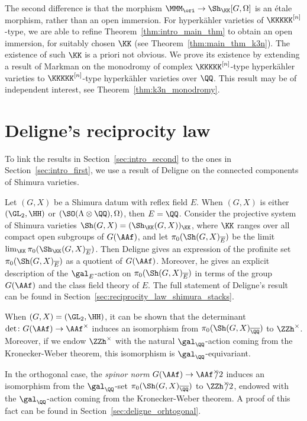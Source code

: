 The second difference is that the morphism $\MMM_{\ori} \rightarrow \Sh_{\KK}[G,\Omega]$ is an \'etale morphism, rather than an open immersion. For hyperk\"ahler varieties of $\KKKKK^{[n]}$-type, we are able to refine Theorem~\ref{thm:intro_main_thm} to obtain an open immersion, for suitably chosen $\KK$ (see Theorem~\ref{thm:main_thm_k3n}). The existence of such $\KK$ is a priori not obvious. We prove its existence by extending a result of Markman on the monodromy of complex $\KKKKK^{[n]}$-type hyperk\"ahler varieties to $\KKKKK^{[n]}$-type hyperk\"ahler varieties over $\QQ$. This result may be of independent interest, see Theorem~\ref{thm:k3n_monodromy}.


\section{Deligne's reciprocity law}
To link the results in Section~\ref{sec:intro_second} to the ones in Section~\ref{sec:intro_first}, we use a result of Deligne on the connected components of Shimura varieties. 

Let $(G,X)$ be a Shimura datum with reflex field $E$. When $(G,X)$ is either $(\GL_2,\HH)$ or $(\SO(\Lambda \otimes \QQ), \Omega)$, then $E = \QQ$. Consider the projective system of Shimura varieties $\Sh(G,X) = (\Sh_{\KK}(G,X))_{\KK}$, where $\KK$ ranges over all compact open subgroups of $G(\AAf)$, and let $\pi_0(\Sh(G,X)_{\overline{E}})$ be the limit $\lim_{\KK} \pi_0(\Sh_{\KK}(G,X)_{\overline{E}})$. Then Deligne gives an expression of the profinite set $\pi_0(\Sh(G,X)_{\overline{E}})$ as a quotient of $G(\AAf)$. Moreover, he gives an explicit description of the $\gal_{E}$-action on $\pi_0(\Sh(G,X)_{\overline{E}})$ in terms of the group $G(\AAf)$ and the class field theory of $E$. The full statement of Deligne's result can be found in Section~\ref{sec:reciprocity_law_shimura_stacks}.

When $(G,X) = (\GL_2, \HH)$, it can be shown that the determinant $\det\colon G(\AAf) \rightarrow \AAf^{\times}$ induces an isomorphism from $\pi_0(\Sh(G,X)_{\overline{\QQ}})$ to $\ZZh^{\times}$. Moreover, if we endow $\ZZh^{\times}$ with the natural $\gal_{\QQ}$-action coming from the Kronecker-Weber theorem, this isomorphism is $\gal_{\QQ}$-equivariant.

In the orthogonal case, the \emph{spinor norm} $G(\AAf) \rightarrow \AAf^{\times}\hspace{-5pt}/2$ induces an isomorphism from the $\gal_{\QQ}$-set $\pi_0(\Sh(G,X)_{\overline{\QQ}})$ to $\ZZh^{\times}\hspace{-5pt}/2$, endowed with the $\gal_{\QQ}$-action coming from the Kronecker-Weber theorem. A proof of this fact can be found in Section~\ref{sec:deligne_orhtogonal}.

